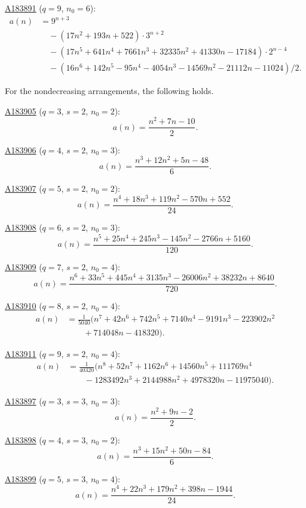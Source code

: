 \documentclass[12pt,reqno]{article}
\newcommand{\seqnum}[1]{\href{https://oeis.org/#1}{\rm \underline{#1}}}
\begin{document}
\begin{theorem}
\noindent\seqnum{A183891} ($q=9$, $n_0 = 6$):
\begin{align*}
a(n) &= 9^{n+3} \\
&\quad - (17n^{2}+193n+522)\cdot 3^{n+2} \\
&\quad - (17n^{5}+641n^{4}+7661n^{3}+32335n^{2}+41330n-17184)\cdot 2^{n-4} \\
&\quad - (16n^{6}+142n^{5}-95n^{4}-4054n^{3}-14569n^{2}-21112n-11024)/2.
\end{align*}

\end{theorem}

\begin{theorem}\label{thm:explicitnd}
For the nondecreasing arrangements, the following holds.

\noindent\seqnum{A183905} ($q=3$, $s=2$, $n_0 = 2$):
\[ a(n) = \frac{n^{2}+7n-10}{2}. \]

\noindent\seqnum{A183906} ($q=4$, $s=2$, $n_0 = 3$):
\[ a(n) = \frac{n^{3}+12n^{2}+5n-48}{6}. \]

\noindent\seqnum{A183907} ($q=5$, $s=2$, $n_0 = 2$):
\[ a(n) = \frac{n^{4}+18n^{3}+119n^{2}-570n+552}{24}. \]

\noindent\seqnum{A183908} ($q=6$, $s=2$, $n_0 = 3$):
\[ a(n) = \frac{n^{5}+25n^{4}+245n^{3}-145n^{2}-2766n+5160}{120}. \]

\noindent\seqnum{A183909} ($q=7$, $s=2$, $n_0 = 4$):
\[ a(n) = \frac{n^{6}+33n^{5}+445n^{4}+3135n^{3}-26006n^{2}+38232n+8640}{720}. \]

\noindent\seqnum{A183910} ($q=8$, $s=2$, $n_0 = 4$):
\begin{align*}
a(n) &= \frac{1}{5040}\bigl(n^{7}+42n^{6}+742n^{5}+7140n^{4}-9191n^{3}-223902n^{2} \\
&\qquad +714048n-418320\bigr).
\end{align*}

\noindent\seqnum{A183911} ($q=9$, $s=2$, $n_0 = 4$):
\begin{align*}
a(n) &= \frac{1}{40320}\bigl(n^{8}+52n^{7}+1162n^{6}+14560n^{5}+111769n^{4} \\
&\qquad -1283492n^{3}+2144988n^{2}+4978320n-11975040\bigr).
\end{align*}

\noindent\seqnum{A183897} ($q=3$, $s=3$, $n_0 = 3$):
\[ a(n) = \frac{n^{2}+9n-2}{2}. \]

\noindent\seqnum{A183898} ($q=4$, $s=3$, $n_0 = 2$):
\[ a(n) = \frac{n^{3}+15n^{2}+50n-84}{6}. \]

\noindent\seqnum{A183899} ($q=5$, $s=3$, $n_0 = 4$):
\[ a(n) = \frac{n^{4}+22n^{3}+179n^{2}+398n-1944}{24}. \]


\end{theorem}
\end{document}
